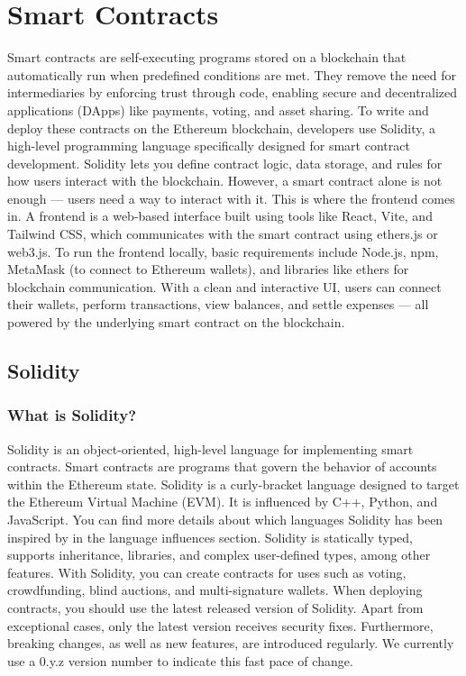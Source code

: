 \documentclass[12pt, a4paper]{article}
\begin{document}
\section{Smart Contracts}
Smart contracts are self-executing programs stored on a blockchain that automatically run when predefined conditions are met. They remove the need for intermediaries by enforcing trust through code, enabling secure and decentralized applications (DApps) like payments, voting, and asset sharing. To write and deploy these contracts on the Ethereum blockchain, developers use Solidity, a high-level programming language specifically designed for smart contract development. Solidity lets you define contract logic, data storage, and rules for how users interact with the blockchain. However, a smart contract alone is not enough — users need a way to interact with it. This is where the frontend comes in. A frontend is a web-based interface built using tools like React, Vite, and Tailwind CSS, which communicates with the smart contract using ethers.js or web3.js. To run the frontend locally, basic requirements include Node.js, npm, MetaMask (to connect to Ethereum wallets), and libraries like ethers for blockchain communication. With a clean and interactive UI, users can connect their wallets, perform transactions, view balances, and settle expenses — all powered by the underlying smart contract on the blockchain.
\subsection{Solidity}
\subsubsection{What is Solidity?}
Solidity is an object-oriented, high-level language for implementing smart contracts. Smart contracts are programs that govern the behavior of accounts within the Ethereum state. Solidity is a curly-bracket language designed to target the Ethereum Virtual Machine (EVM). It is influenced by C++, Python, and JavaScript. You can find more details about which languages Solidity has been inspired by in the language influences section. Solidity is statically typed, supports inheritance, libraries, and complex user-defined types, among other features. With Solidity, you can create contracts for uses such as voting, crowdfunding, blind auctions, and multi-signature wallets. When deploying contracts, you should use the latest released version of Solidity. Apart from exceptional cases, only the latest version receives security fixes. Furthermore, breaking changes, as well as new features, are introduced regularly. We currently use a 0.y.z version number to indicate this fast pace of change.
\end{document}
